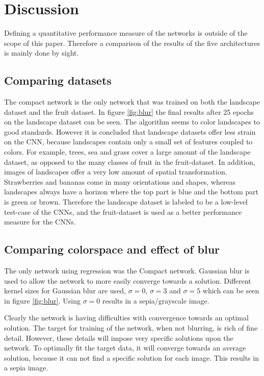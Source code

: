 \section{Discussion}

Defining a quantitative performance measure of the networks is outside of the scope of this paper. Therefore a comparison of the results of the five architectures is mainly done by sight.

\subsection{Comparing datasets}
The compact network is the only network that was trained on both the landscape dataset and the fruit dataset. In figure \ref{fig:blur} the final results after 25 epochs on the landscape dataset can be seen. The algorithm seems to color landscapes to good standards. However it is concluded that landscape datasets offer less strain on the CNN, because landscapes contain only a small set of features coupled to colors. For example, trees, sea and grass cover a large amount of the landscape dataset, as opposed to the many classes of fruit in the fruit-dataset. In addition, images of landscapes offer a very low amount of spatial transformation. Strawberries and bananas come in many orientations and shapes, whereas landscapes always have a horizon where the top part is blue and the bottom part is green or brown. Therefore the landscape dataset is labeled to be a low-level test-case of the CNNs, and the fruit-dataset is used as a better performance measure for the CNNs.

\subsection{Comparing colorspace and effect of blur}
The only network using regression was the Compact network. Gaussian blur is used to allow the network to more easily converge towards a solution. Different kernel sizes for Gaussian blur are used, $\sigma = 0$, $\sigma = 3$ and $\sigma = 5$ which can be seen in figure \ref{fig:blur}. Using $\sigma = 0 $ results in a sepia/grayscale image.

Clearly the network is having difficulties with convergence towards an optimal solution. The target for training of the network, when not blurring, is rich of fine detail. However, these details will impose very specific solutions upon the network. To optimally fit the target data, it will converge towards an average solution, because it can not find a specific solution for each image. This results in a sepia image.

